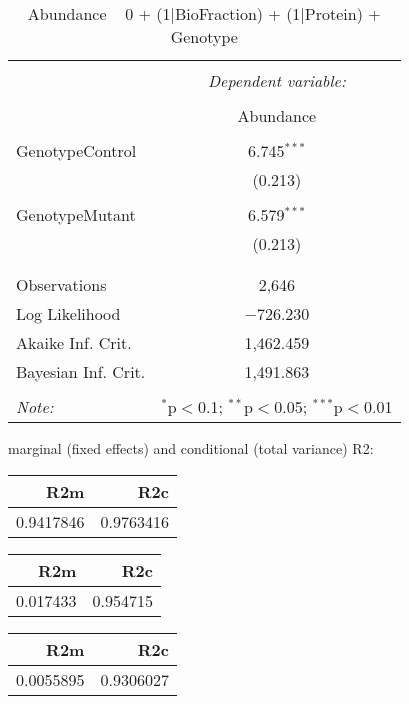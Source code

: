 \documentclass[11pt]{report}
\begin{document}
\begin{table}[!htbp] \centering 
  \caption{Abundance ~ 0 + (1|BioFraction) + (1|Protein) + Genotype} 
  \label{} 
\begin{tabular}{@{\extracolsep{5pt}}lc} 
\\[-1.8ex]\hline 
\hline \\[-1.8ex] 
 & \multicolumn{1}{c}{\textit{Dependent variable:}} \\ 
\cline{2-2} 
\\[-1.8ex] & Abundance \\ 
\hline \\[-1.8ex] 
 GenotypeControl & 6.745$^{***}$ \\ 
  & (0.213) \\ 
  & \\ 
 GenotypeMutant & 6.579$^{***}$ \\ 
  & (0.213) \\ 
  & \\ 
\hline \\[-1.8ex] 
Observations & 2,646 \\ 
Log Likelihood & $-$726.230 \\ 
Akaike Inf. Crit. & 1,462.459 \\ 
Bayesian Inf. Crit. & 1,491.863 \\ 
\hline 
\hline \\[-1.8ex] 
\textit{Note:}  & \multicolumn{1}{r}{$^{*}$p$<$0.1; $^{**}$p$<$0.05; $^{***}$p$<$0.01} \\ 
\end{tabular} 
\end{table} 
marginal (fixed effects) and conditional (total variance) R2:

\begin{tabular}{r|r}
\hline
R2m & R2c\\
\hline
0.9417846 & 0.9763416\\
\hline
\end{tabular}

\begin{tabular}{r|r}
\hline
R2m & R2c\\
\hline
0.017433 & 0.954715\\
\hline
\end{tabular}

\begin{tabular}{r|r}
\hline
R2m & R2c\\
\hline
0.0055895 & 0.9306027\\
\hline
\end{tabular}
\end{document}
